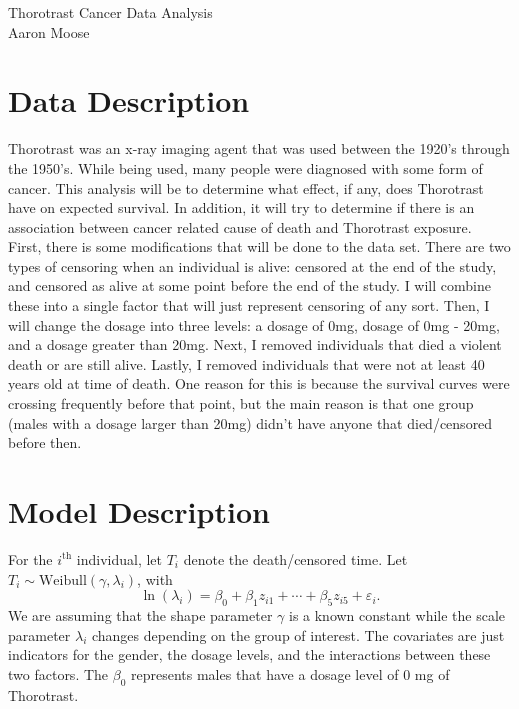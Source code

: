 \documentclass[12pt, onesided]{article}
\begin{document}
\begin{center}
\Huge{Thorotrast Cancer Data Analysis} \\
\huge{Aaron Moose}
\end{center}

\section{Data Description}
\indent Thorotrast was an x-ray imaging agent that was used between the 1920's through the 1950's. While being used, many people were diagnosed with some form of cancer. This analysis will be to determine what effect, if any, does Thorotrast have on expected survival. In addition, it will try to determine if there is an association between cancer related cause of death and Thorotrast exposure. \\

\indent First, there is some modifications that will be done to the data set. There are two types of censoring when an individual is alive: censored at the end of the study, and censored as alive at some point before the end of the study. I will combine these into a single factor that will just represent censoring of any sort. Then, I will change the dosage into three levels: a dosage of 0mg, dosage of 0mg - 20mg, and a dosage greater than 20mg. Next, I removed individuals that died a violent death or are still alive. Lastly, I removed individuals that were not at least 40 years old at time of death. One reason for this is because the survival curves were crossing frequently before that point, but the main reason is that one group (males with a dosage larger than 20mg) didn't have anyone that died/censored before then.

\section{Model Description}
\indent For the $i^{\mbox{th}}$ individual, let $T_i$ denote the death/censored time. Let $T_i \sim \mbox{Weibull}(\gamma, \lambda_i)$, with
$$\ln(\lambda_i) = \beta_0 + \beta_1 z_{i1} + \cdots + \beta_5 z_{i5} + \varepsilon_i.$$
\indent We are assuming that the shape parameter $\gamma$ is a known constant while the scale parameter $\lambda_i$ changes depending on the group of interest. The covariates are just indicators for the gender, the dosage levels, and the interactions between these two factors. The $\beta_0$ represents males that have a dosage level of 0 mg of Thorotrast. \\
\end{document}
